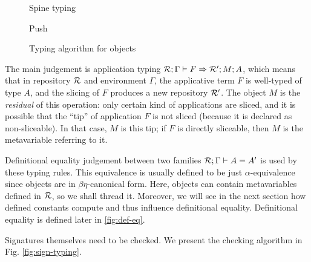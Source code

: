 \documentclass[9pt]{sigplanconf}
\begin{document}
\begin{figure*}
  \begin{mathpar}

  \end{mathpar}

  \qquad
  {Spine typing}

  \qquad
  {Push}

  \begin{mathpar}
  \end{mathpar}

  \caption{Typing algorithm for objects}
  \label{fig:obj-typing}
\end{figure*}

The main judgement is application typing $\jf\mr\Gamma F \mmr M A$,
which means that in repository $\mr$ and environment $\Gamma$, the
applicative term $F$ is well-typed of type $A$, and the slicing of $F$
produces a new repository $\mmr$. The object $M$ is the
\emph{residual} of this operation: only certain kind of applications
are sliced, and it is possible that the ``tip'' of application $F$ is
not sliced (because it is declared as non-sliceable). In that case,
$M$ is this tip; if $F$ is directly sliceable, then $M$ is the
metavariable referring to it.

Definitional equality judgement between two families $\jea\mr\Gamma A
{A'}$ is used by these typing rules. This equivalence is usually
defined to be just $\alpha$-equivalence since objects are in
$\beta\eta$-canonical form. Here, objects can contain metavariables
defined in $\mr$, so we shall thread it. Moreover, we will see in the
next section how defined constants compute and thus influence
definitional equality. Definitional equality is defined later in
\ref{fig:def-eq}.

Signatures themselves need to be checked. We present the checking
algorithm in Fig. \ref{fig:sign-typing}.
\end{document}
